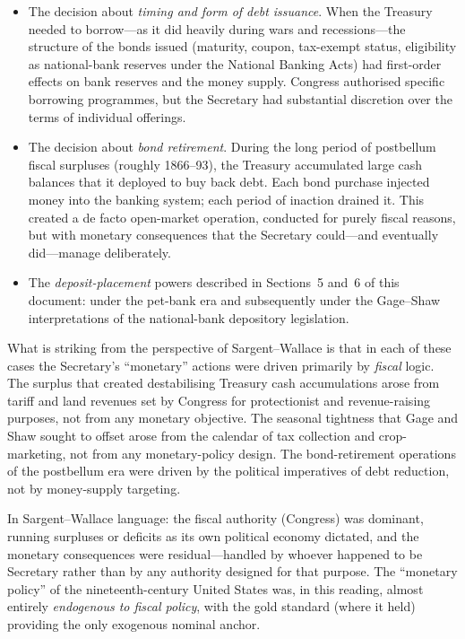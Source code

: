 \documentclass[12pt]{article}
\begin{document}
\begin{itemize}
  \item The decision about \emph{timing and form of debt issuance}.
    When the Treasury needed to borrow---as it did heavily during wars
    and recessions---the structure of the bonds issued (maturity,
    coupon, tax-exempt status, eligibility as national-bank reserves
    under the National Banking Acts) had first-order effects on bank
    reserves and the money supply.  Congress authorised specific
    borrowing programmes, but the Secretary had substantial discretion
    over the terms of individual offerings.

  \item The decision about \emph{bond retirement}.  During the
    long period of postbellum fiscal surpluses (roughly 1866--93),
    the Treasury accumulated large cash balances that it deployed to
    buy back debt.  Each bond purchase injected money into the
    banking system; each period of inaction drained it.  This
    created a de facto open-market operation, conducted for purely
    fiscal reasons, but with monetary consequences that the Secretary
    could---and eventually did---manage deliberately.

  \item The \emph{deposit-placement} powers described in Sections~5
    and~6 of this document: under the pet-bank era and subsequently
    under the Gage--Shaw interpretations of the national-bank
    depository legislation.
\end{itemize}

What is striking from the perspective of Sargent--Wallace is that
in each of these cases the Secretary's ``monetary'' actions were
driven primarily by \emph{fiscal} logic.  The surplus that created
destabilising Treasury cash accumulations arose from tariff and land
revenues set by Congress for protectionist and revenue-raising
purposes, not from any monetary objective.  The seasonal tightness
that Gage and Shaw sought to offset arose from the calendar of tax
collection and crop-marketing, not from any monetary-policy design.
The bond-retirement operations of the postbellum era were driven by
the political imperatives of debt reduction, not by money-supply
targeting.

In Sargent--Wallace language: the fiscal authority (Congress) was
dominant, running surpluses or deficits as its own political economy
dictated, and the monetary consequences were residual---handled by
whoever happened to be Secretary rather than by any authority designed
for that purpose.  The ``monetary policy'' of the nineteenth-century
United States was, in this reading, almost entirely \emph{endogenous
to fiscal policy}, with the gold standard (where it held) providing
the only exogenous nominal anchor.
\end{document}
